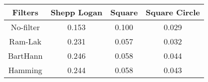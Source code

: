 \begin{tabular}{|c|c|c|c|}
\hline 
Filters & Shepp Logan & Square & Square Circle \\ 
\hline 
No-filter & 0.153 & 0.100 & 0.029 \\ 
Ram-Lak & 0.231 & 0.057 & 0.032 \\ 
BartHann & 0.246 & 0.058 & 0.044 \\ 
Hamming & 0.244 & 0.058 & 0.043 \\ 
\hline 
\end{tabular}